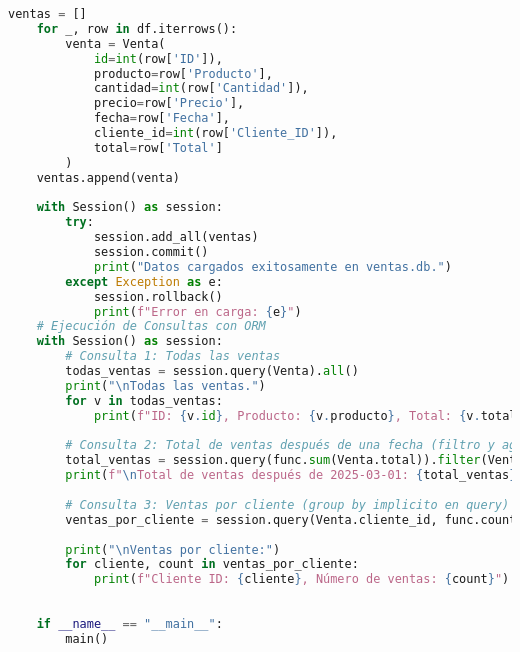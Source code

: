 \documentclass[12pt,a4paper]{article}
\begin{document}
\begin{lstlisting}[language=Python, caption={ETL con SQLAlchemy}]
    ventas = []
    for _, row in df.iterrows():
        venta = Venta(
            id=int(row['ID']),
            producto=row['Producto'],
            cantidad=int(row['Cantidad']),
            precio=row['Precio'],
            fecha=row['Fecha'],
            cliente_id=int(row['Cliente_ID']),
            total=row['Total']
        )    
    ventas.append(venta)
    
    with Session() as session:
        try:
            session.add_all(ventas)
            session.commit()
            print("Datos cargados exitosamente en ventas.db.")
        except Exception as e:
            session.rollback()
            print(f"Error en carga: {e}")
    # Ejecución de Consultas con ORM
    with Session() as session:
        # Consulta 1: Todas las ventas
        todas_ventas = session.query(Venta).all()
        print("\nTodas las ventas.")
        for v in todas_ventas:
            print(f"ID: {v.id}, Producto: {v.producto}, Total: {v.total}")
            
        # Consulta 2: Total de ventas después de una fecha (filtro y agregación)
        total_ventas = session.query(func.sum(Venta.total)).filter(Venta.fecha > pd.to_datetime("2025-03-01")).scalar()
        print(f"\nTotal de ventas después de 2025-03-01: {total_ventas}")
        
        # Consulta 3: Ventas por cliente (group by implicito en query)
        ventas_por_cliente = session.query(Venta.cliente_id, func.count(Venta.id)).group_by(Venta.cliente_id).all()
        
        print("\nVentas por cliente:")
        for cliente, count in ventas_por_cliente:
            print(f"Cliente ID: {cliente}, Número de ventas: {count}")
            
            
    if __name__ == "__main__":
        main()
\end{lstlisting}
\end{document}
